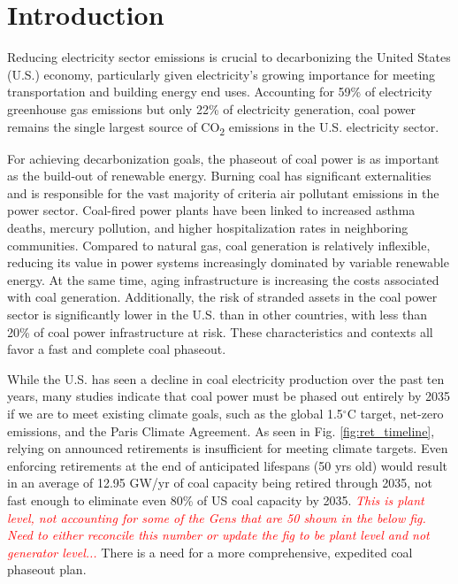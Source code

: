 \setlength{\parindent}{20pt}


\section{Introduction}



Reducing electricity sector emissions is crucial to decarbonizing the United States (U.S.) economy, particularly given electricity's growing importance for meeting transportation and building energy end uses.
Accounting for 59\% of electricity greenhouse gas emissions but only 22\% of electricity generation, coal power remains the single largest source of CO\textsubscript{2} emissions in the U.S. electricity sector.

For achieving decarbonization goals, the phaseout of coal power is as important as the build-out of renewable energy.
Burning coal has significant externalities and is responsible for the vast majority of criteria air pollutant emissions in the power sector.
Coal-fired power plants have been linked to increased asthma deaths, mercury pollution, and higher hospitalization rates in neighboring communities.
Compared to natural gas, coal generation is relatively inflexible, reducing its value in power systems increasingly dominated by variable renewable energy. At the same time, aging infrastructure is increasing the costs associated with coal generation.
Additionally, the risk of stranded assets in the coal power sector is significantly lower in the U.S. than in other countries, with less than 20\% of coal power infrastructure at risk.
These characteristics and contexts all favor a fast and complete coal phaseout. 

While the U.S. has seen a decline in coal electricity production over the past ten years, many studies indicate that coal power must be phased out entirely by 2035 if we are to meet existing climate goals, such as the global 1.5$^\circ$C target, 
net-zero emissions, 
and the Paris Climate Agreement. As seen in Fig. \ref{fig:ret_timeline}, relying on announced retirements is insufficient for meeting climate targets.
Even enforcing retirements at the end of anticipated lifespans (50 yrs old) would result in an average of 12.95 GW/yr of coal capacity being retired through 2035,
not fast enough to eliminate even 80\% of US coal capacity by 2035. 
\textcolor{red}{\textit{This is plant level, not accounting for some of the Gens that are 50 shown in the below fig. Need to either reconcile this number or update the fig to be plant level and not generator level...}}
There is a need for a more comprehensive, expedited coal phaseout plan.

